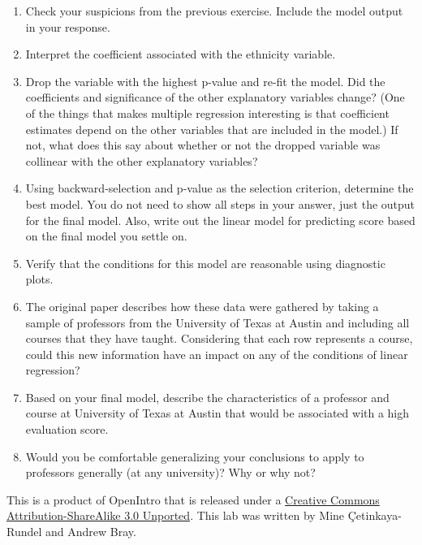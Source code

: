 \documentclass[]{book}
\theoremstyle{definition}
\theoremstyle{definition}
\theoremstyle{remark}
\begin{document}
\begin{enumerate}
\def\labelenumi{\arabic{enumi}.}
\setcounter{enumi}{11}
\item
  Check your suspicions from the previous exercise. Include the model
  output in your response.
\item
  Interpret the coefficient associated with the ethnicity variable.
\item
  Drop the variable with the highest p-value and re-fit the model. Did
  the coefficients and significance of the other explanatory variables
  change? (One of the things that makes multiple regression interesting
  is that coefficient estimates depend on the other variables that are
  included in the model.) If not, what does this say about whether or
  not the dropped variable was collinear with the other explanatory
  variables?
\item
  Using backward-selection and p-value as the selection criterion,
  determine the best model. You do not need to show all steps in your
  answer, just the output for the final model. Also, write out the
  linear model for predicting score based on the final model you settle
  on.
\item
  Verify that the conditions for this model are reasonable using
  diagnostic plots.
\item
  The original paper describes how these data were gathered by taking a
  sample of professors from the University of Texas at Austin and
  including all courses that they have taught. Considering that each row
  represents a course, could this new information have an impact on any
  of the conditions of linear regression?
\item
  Based on your final model, describe the characteristics of a professor
  and course at University of Texas at Austin that would be associated
  with a high evaluation score.
\item
  Would you be comfortable generalizing your conclusions to apply to
  professors generally (at any university)? Why or why not?
\end{enumerate}

\hypertarget{license}{}
This is a product of OpenIntro that is released under a
\href{http://creativecommons.org/licenses/by-sa/3.0}{Creative Commons
Attribution-ShareAlike 3.0 Unported}. This lab was written by Mine
Çetinkaya-Rundel and Andrew Bray.


\end{document}
